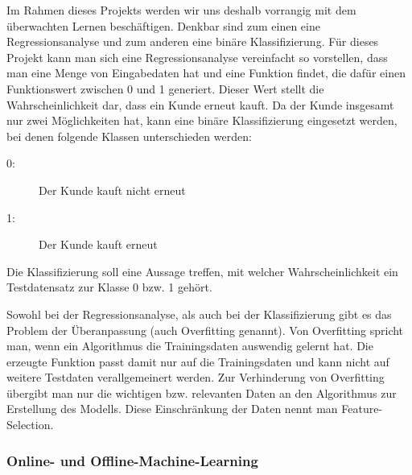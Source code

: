 Im Rahmen dieses Projekts werden wir uns deshalb vorrangig mit dem überwachten Lernen beschäftigen. 
Denkbar sind zum einen eine Regressionsanalyse und zum anderen eine binäre Klassifizierung.
Für dieses Projekt kann man sich eine Regressionsanalyse vereinfacht so vorstellen, dass man eine Menge
von Eingabedaten hat und eine Funktion findet, die dafür einen Funktionswert zwischen 0 und 1 generiert. 
Dieser Wert stellt die Wahrscheinlichkeit dar, dass ein Kunde erneut kauft. Da der Kunde insgesamt nur 
zwei Möglichkeiten hat, kann eine binäre Klassifizierung eingesetzt werden, bei denen folgende Klassen 
unterschieden werden:

\begin{description}
	\item[0:] Der Kunde kauft nicht erneut
	\item[1:] Der Kunde kauft erneut
\end{description}
Die Klassifizierung soll eine Aussage treffen, mit welcher Wahrscheinlichkeit ein Testdatensatz zur Klasse 0 bzw. 1 gehört.

Sowohl bei der Regressionsanalyse, als auch bei der Klassifizierung gibt es das Problem der Überanpassung (auch Overfitting genannt). Von Overfitting spricht man, wenn ein Algorithmus die Trainingsdaten auswendig gelernt hat.
Die erzeugte Funktion passt damit nur auf die Trainingsdaten und kann nicht auf weitere
Testdaten verallgemeinert werden. Zur Verhinderung von Overfitting übergibt man nur die wichtigen bzw. relevanten Daten an den Algorithmus zur Erstellung des Modells. Diese Einschränkung der Daten nennt man Feature-Selection.

\subsubsection{Online- und Offline-Machine-Learning}

